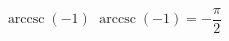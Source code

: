  {$\operatorname{arccsc} \left( -1 \right)$ }
{ $\operatorname{arccsc} \left( -1 \right) = -\dfrac{\pi}{2}$ }
